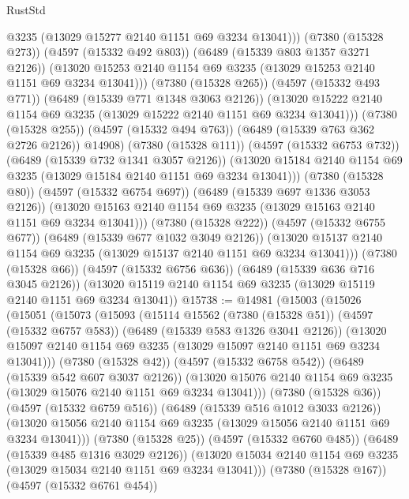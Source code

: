 \begin{lexlean}{RustStd}
\begin{coremodule}
                    @3235
                    (@13029 @15277 @2140 @1151 @69 @3234 @13041)))
                (@7380 (@15328 @273))
                (@4597 (@15332 @492 @803))
                (@6489 (@15339 @803 @1357 @3271 @2126))
                (@13020 @15253 @2140 @1154 @69 @3235 (@13029 @15253 @2140 @1151 @69 @3234 @13041)))
              (@7380 (@15328 @265))
              (@4597 (@15332 @493 @771))
              (@6489 (@15339 @771 @1348 @3063 @2126))
              (@13020 @15222 @2140 @1154 @69 @3235 (@13029 @15222 @2140 @1151 @69 @3234 @13041)))
            (@7380 (@15328 @255))
            (@4597 (@15332 @494 @763))
            (@6489 (@15339 @763 @362 @2726 @2126))
            @14908)
          (@7380 (@15328 @111))
          (@4597 (@15332 @6753 @732))
          (@6489 (@15339 @732 @1341 @3057 @2126))
          (@13020 @15184 @2140 @1154 @69 @3235 (@13029 @15184 @2140 @1151 @69 @3234 @13041)))
        (@7380 (@15328 @80))
        (@4597 (@15332 @6754 @697))
        (@6489 (@15339 @697 @1336 @3053 @2126))
        (@13020 @15163 @2140 @1154 @69 @3235 (@13029 @15163 @2140 @1151 @69 @3234 @13041)))
      (@7380 (@15328 @222))
      (@4597 (@15332 @6755 @677))
      (@6489 (@15339 @677 @1032 @3049 @2126))
      (@13020 @15137 @2140 @1154 @69 @3235 (@13029 @15137 @2140 @1151 @69 @3234 @13041)))
    (@7380 (@15328 @66))
    (@4597 (@15332 @6756 @636))
    (@6489 (@15339 @636 @716 @3045 @2126))
    (@13020 @15119 @2140 @1154 @69 @3235 (@13029 @15119 @2140 @1151 @69 @3234 @13041))
@15738 := @14981
    (@15003
      (@15026
        (@15051
          (@15073
            (@15093
              (@15114
                @15562
                (@7380 (@15328 @51))
                (@4597 (@15332 @6757 @583))
                (@6489 (@15339 @583 @1326 @3041 @2126))
                (@13020 @15097 @2140 @1154 @69 @3235 (@13029 @15097 @2140 @1151 @69 @3234 @13041)))
              (@7380 (@15328 @42))
              (@4597 (@15332 @6758 @542))
              (@6489 (@15339 @542 @607 @3037 @2126))
              (@13020 @15076 @2140 @1154 @69 @3235 (@13029 @15076 @2140 @1151 @69 @3234 @13041)))
            (@7380 (@15328 @36))
            (@4597 (@15332 @6759 @516))
            (@6489 (@15339 @516 @1012 @3033 @2126))
            (@13020 @15056 @2140 @1154 @69 @3235 (@13029 @15056 @2140 @1151 @69 @3234 @13041)))
          (@7380 (@15328 @25))
          (@4597 (@15332 @6760 @485))
          (@6489 (@15339 @485 @1316 @3029 @2126))
          (@13020 @15034 @2140 @1154 @69 @3235 (@13029 @15034 @2140 @1151 @69 @3234 @13041)))
        (@7380 (@15328 @167))
        (@4597 (@15332 @6761 @454))

\end{coremodule}
\end{lexlean}
